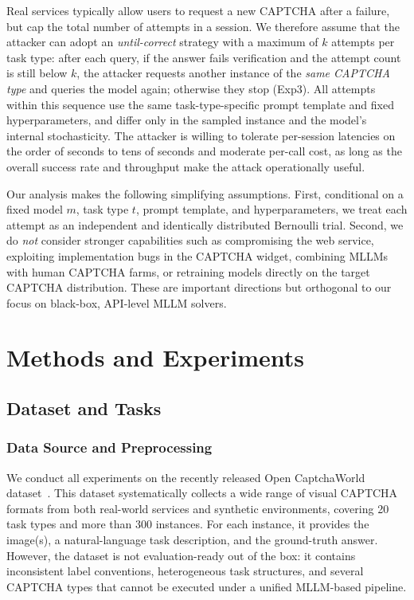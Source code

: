 \documentclass[sigconf, review]{acmart}
\begin{document}
Real services typically allow users to request a new CAPTCHA after a failure, but cap the total number of attempts in a session. We therefore assume that the attacker can adopt an \emph{until-correct} strategy with a maximum of $k$ attempts per task type: after each query, if the answer fails verification and the attempt count is still below $k$, the attacker requests another instance of the \emph{same CAPTCHA type} and queries the model again; otherwise they stop (Exp3). All attempts within this sequence use the same task-type-specific prompt template and fixed hyperparameters, and differ only in the sampled instance and the model’s internal stochasticity. The attacker is willing to tolerate per-session latencies on the order of seconds to tens of seconds and moderate per-call cost, as long as the overall success rate and throughput make the attack operationally useful.


Our analysis makes the following simplifying assumptions. First, conditional on a fixed model $m$, task type $t$, prompt template, and hyperparameters, we treat each attempt as an independent and identically distributed Bernoulli trial. Second, we do \emph{not} consider stronger capabilities such as compromising the web service, exploiting implementation bugs in the CAPTCHA widget, combining MLLMs with human CAPTCHA farms, or retraining models directly on the target CAPTCHA distribution. These are important directions but orthogonal to our focus on black-box, API-level MLLM solvers.



\section{Methods and Experiments}
\label{sec:methods}
\subsection{Dataset and Tasks}

\subsubsection{Data Source and Preprocessing}

We conduct all experiments on the recently released Open CaptchaWorld dataset~\cite{captchaworld25}. This dataset systematically collects a wide range of visual CAPTCHA formats from both real-world services and synthetic environments, covering 20 task types and more than 300 instances. For each instance, it provides the image(s), a natural-language task description, and the ground-truth answer. However, the dataset is not evaluation-ready out of the box: it contains inconsistent label conventions, heterogeneous task structures, and several CAPTCHA types that cannot be executed under a unified MLLM-based pipeline.
\end{document}
